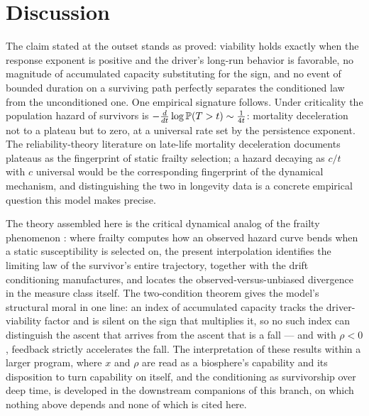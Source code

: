 \section{Discussion}\label{sec:discussion}

The claim stated at the outset stands as proved: viability holds
exactly when the response exponent is positive and the driver's
long-run behavior is favorable, no magnitude of accumulated capacity
substituting for the sign, and no event of bounded duration on a surviving
path perfectly separates the conditioned law from the unconditioned
one. One
empirical signature follows. Under criticality the
population hazard of survivors is $-\frac{d}{dt}\log\mathbb{P}(T>t)\sim
\frac{1}{4t}$: mortality deceleration not to a plateau but to zero, at
a universal rate set by the persistence exponent. The
reliability-theory literature on late-life mortality deceleration
\cite{GG01} documents plateaus as the fingerprint of static frailty
selection; a hazard decaying as $c/t$ with $c$ universal would be the
corresponding fingerprint of the dynamical mechanism, and
distinguishing the two in longevity data is a concrete empirical
question this model makes precise.

The theory assembled here is the critical dynamical analog of the
frailty phenomenon \cite{VMS79,VY85}: where frailty computes how an
observed hazard curve bends when a static susceptibility is selected
on, the present interpolation identifies the limiting law of the
survivor's entire trajectory, together with the drift conditioning
manufactures, and locates the observed-versus-unbiased divergence in
the measure class itself. The two-condition theorem gives the model's
structural moral in one line: an index of accumulated capacity tracks
the driver-viability factor and is silent on the sign that multiplies it, so
no such index can distinguish the ascent that arrives from the ascent
that is a fall --- and with $\rho<0$, feedback strictly accelerates
the fall. The interpretation of these results within a larger program, where $x$ and $\rho$ are read as a biosphere's capability and its
disposition to turn capability on itself, and the conditioning as
survivorship over deep time, is developed in the downstream companions of this branch, on which
nothing above depends and none of which is cited here.

